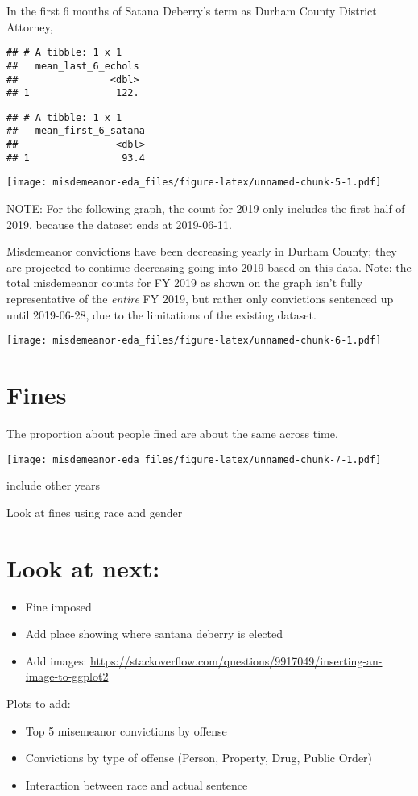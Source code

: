 \documentclass[
]{article}
\begin{document}
In the first 6 months of Satana Deberry's term as Durham County District
Attorney,

\begin{verbatim}
## # A tibble: 1 x 1
##   mean_last_6_echols
##                <dbl>
## 1               122.
\end{verbatim}

\begin{verbatim}
## # A tibble: 1 x 1
##   mean_first_6_satana
##                 <dbl>
## 1                93.4
\end{verbatim}

\texttt{[image: misdemeanor-eda\_files/figure-latex/unnamed-chunk-5-1.pdf]}

NOTE: For the following graph, the count for 2019 only includes the
first half of 2019, because the dataset ends at 2019-06-11.

Misdemeanor convictions have been decreasing yearly in Durham County;
they are projected to continue decreasing going into 2019 based on this
data. Note: the total misdemeanor counts for FY 2019 as shown on the
graph isn't fully representative of the \emph{entire} FY 2019, but
rather only convictions sentenced up until 2019-06-28, due to the
limitations of the existing dataset.

\texttt{[image: misdemeanor-eda\_files/figure-latex/unnamed-chunk-6-1.pdf]}

\hypertarget{fines}{%
\section{Fines}\label{fines}}

The proportion about people fined are about the same across time.

\texttt{[image: misdemeanor-eda\_files/figure-latex/unnamed-chunk-7-1.pdf]}

include other years

Look at fines using race and gender

\hypertarget{look-at-next}{%
\section{Look at next:}\label{look-at-next}}

\begin{itemize}
\item
  Fine imposed
\item
  Add place showing where santana deberry is elected
\item
  Add images:
  \url{https://stackoverflow.com/questions/9917049/inserting-an-image-to-ggplot2}
\end{itemize}

Plots to add:

\begin{itemize}
\item
  Top 5 misemeanor convictions by offense
\item
  Convictions by type of offense (Person, Property, Drug, Public Order)
\item
  Interaction between race and actual sentence
\end{itemize}
\end{document}
